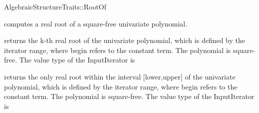 \begin{ccRefConcept}{AlgebraicStructureTraits::RootOf}

\ccDefinition

 computes a real root of a square-free univariate
polynomial.

\ccRefines


\ccTypes


\ccOperations
{}

        {returns the k-th real root of the univariate polynomial,
        which is defined by the iterator range,
        where begin refers to the constant term.
        \ccPrecond The polynomial is square-free.
        \ccPrecond The value type of the InputIterator is \\ }

\begin{ccAdvanced}
        {returns the only real root within the interval [lower,upper]
        of the univariate polynomial, which is defined by the iterator
        range, where begin refers to the constant term.
        \ccPrecond The polynomial is square-free.
        \ccPrecond The value type of the InputIterator is \\
}
\end{ccAdvanced}


\ccSeeAlso

\\

\end{ccRefConcept}
